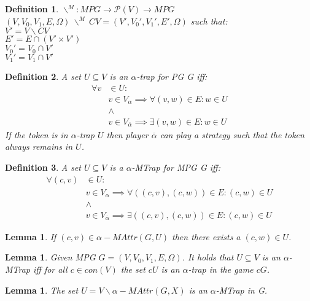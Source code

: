 \documentclass[]{article}
\newtheorem{definition}{Definition}[section]
\newtheorem{lemma}[theorem]{Lemma}
\begin{document}
	\begin{definition}
		$\backslash^{\!\!M} : \textit{MPG} \rightarrow \mathcal{P}(V) \rightarrow \textit{MPG}$\\
		$(V, V_0, V_1, E, \Omega)\ \backslash^{\!\!M}\ CV = (V', V_0', V_1', E', \Omega)$ such that:\\
		$V' = V \backslash CV$\\
		$E' = E \cap (V' \times V')$\\
		$V_0' = V_0 \cap V'$\\
		$V_1' = V_1 \cap V'$
	\end{definition}
\begin{definition}\cite{ZIELONKA1998135}
	A set $U \subseteq V$ is an $\alpha$-trap for PG G iff:
	\begin{align*}
	\forall v &\in U:\\
	&v \in V_\alpha \implies \forall(v,w) \in E : w \in U\\
	&\wedge\\
	&v \in V_{\overline{\alpha}} \implies \exists (v,w) \in E : w \in U
	\end{align*}
If the token is in $\alpha$-trap $U$ then player $\overline{\alpha}$ can play a strategy such that the token always remains in $U$.
\end{definition}
\begin{definition}
	A set $U \subseteq V$ is a $\alpha$-MTrap for MPG G iff:
\begin{align*}
\forall(c,v) &\in U:\\
&v \in V_\alpha \implies \forall((c,v),(c,w)) \in E : (c,w) \in U\\
&\wedge\\
&v \in V_{\overline{\alpha}} \implies \exists ((c,v),(c,w)) \in E : (c,w) \in U
\end{align*}
\end{definition}
\begin{lemma}
	\label{lem_MPG_MAttr_conf_neutrality}
	If $(c,v) \in \alpha{-}MAttr(G, U)$ then there exists a $(c,w) \in U$.
\end{lemma}
\begin{lemma}
	\label{lem_MPG_MTrap_is_trap}
Given MPG $G = (V, V_0, V_1, E, \Omega)$. It holds that $U \subseteq V$ is an $\alpha$-MTrap iff for all $c \in con(V)$ the set $cU$ is an $\alpha$-trap in the game $cG$.
\end{lemma}
\begin{lemma}
	\label{lem_MPG_attr_exc_trap}
	The set $U=V\backslash \alpha{-}MAttr(G,X)$ is an $\alpha$-MTrap in G.
\end{lemma}
\end{document}
